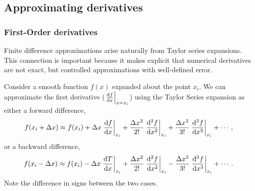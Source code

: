 \subsection{Approximating derivatives}
\subsubsection{First-Order derivatives}

Finite difference approximations arise naturally from Taylor series
expansions. This connection is important because it makes explicit that
numerical derivatives are not exact, but controlled approximations with
well-defined error.

Consider a smooth function $f(x)$ expanded about the point $x_i$.  We can approximate the first derivative ($\eval{\dv{f}{x}}_{x=x_i}$) using the Taylor Series expansion as either a forward difference,
\begin{equation}
    f(x_i + \Delta x) \approx
    f(x_i)
    + \Delta x \eval{\dv{f}{x}}_{x_i}
    + \frac{\Delta x^2}{2!} \eval{\dv[2]{f}{x}}_{x_i}
    + \frac{\Delta x^3}{3!} \eval{\dv[3]{f}{x}}_{x_i}
    + \cdots,
    \label{eq:ftaylor}
\end{equation}
or a backward difference,
\begin{equation}
    f(x_i - \Delta x) \approx
    f(x_i)
    - \Delta x \eval{\dv{T}{x}}_{x_i}
    + \frac{\Delta x^2}{2!} \eval{\dv[2]{f}{x}}_{x_i}
    - \frac{\Delta x^3}{3!} \eval{\dv[3]{f}{x}}_{x_i}
    + \cdots.
    \label{eq:btaylor}
\end{equation}
Note the difference in signs between the two cases.

